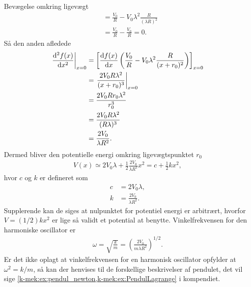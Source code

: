 \documentclass[crop=false, class=memoir]{standalone}
\begin{document}
\begin{opgave}[2]{Bevægelse omkring ligevægt}
\begin{align*}
	 &= \frac{V_0}{R} - V_0\lambda^2\frac{R}{(\lambda R)^2} \\
	 &= \frac{V_0}{R} - \frac{V_0}{R} = 0.
\end{align*}
%
Så den anden afledede
%
\begin{align*}
	 \left.\dv[2]{f(x)}{x}\right|_{x=0} &= \left[\dv{f(x)}{x}\left(\frac{V_0}{R} - V_0\lambda^2\frac{R}{(x+r_0)^2}\right)\right]_{x=0} \\
	 &= \left.\frac{2V_0R\lambda^2}{(x+r_0)^3}\right|_{x=0} \\
	 &= \frac{2V_0Rr_0\lambda^2}{r_0^3} \\
	 &= \frac{2V_0R\lambda^2}{(R\lambda)^3} \\
	 &= \frac{2V_0}{\lambda R^2}.
\end{align*}
%
Dermed bliver den potentielle energi omkring ligevægtspunktet $r_0$
%
\begin{align*}
	V(x) \simeq 2V_0\lambda + \frac{1}{2}\frac{2V_0}{\lambda R^2}x^2 = c + \frac{1}{2}kx^2,
\end{align*}
%
hvor $c$ og $k$ er defineret som
%
\begin{align*}
	c &= 2V_0\lambda,\\
	k &= \frac{2V_0}{\lambda R^2}.
\end{align*}
%
Supplerende kan de siges at nulpunktet for potentiel energi er arbitrært, hvorfor $V = (1/2)kx^2$ er lige så validt et potential at benytte.
%
\opg Vinkelfrekvensen for den harmoniske oscillator er
%
\begin{align*}
	\omega = \sqrt{\frac{k}{m}} = \left(\frac{2V_0}{m\lambda R^2}\right)^{1/2}.
\end{align*}
%
Er det ikke oplagt at vinkelfrekvensen for en harmonisk oscillator opfylder at $\omega^2 = k/m$, så kan der henvises til de forskellige beskrivelser af pendulet, det vil sige \cref{k-mek:ex:pendul_newton,k-mek:ex:PendulLagrange} i kompendiet.
\end{opgave}
\end{document}
